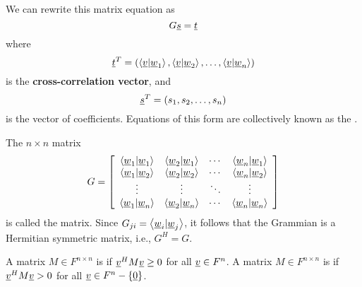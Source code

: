 We can rewrite this matrix equation as
\begin{equation*}
G \underline{s} = \underline{t}
\end{equation*}
where
\begin{equation*}
\underline{t}^T = 
\left(
\left\langle \underline{v} | \underline{w}_1 \right\rangle,
\left\langle \underline{v} | \underline{w}_2 \right\rangle, \ldots,
\left\langle \underline{v} | \underline{w}_n \right\rangle \right)
\end{equation*}
is the \textbf{cross-correlation vector}, and
\begin{equation*}
\underline{s}^T = 
\left( s_1, s_2, \ldots, s_n \right)
\end{equation*}
is the vector of coefficients.
Equations of this form are collectively known as the .

\begin{definition}
The $n \times n$ matrix
\begin{equation} \label{equation:GrammianMatrix}
G = \left[ \begin{array}{cccc}
\left\langle \underline{w}_1 | \underline{w}_1 \right\rangle
& \left\langle \underline{w}_2 | \underline{w}_1 \right\rangle & \cdots
& \left\langle \underline{w}_n | \underline{w}_1 \right\rangle \\
\left\langle \underline{w}_1 | \underline{w}_2 \right\rangle
& \left\langle \underline{w}_2 | \underline{w}_2 \right\rangle & \cdots
& \left\langle \underline{w}_n | \underline{w}_2 \right\rangle \\
\vdots & \vdots & \ddots & \vdots \\
\left\langle \underline{w}_1 | \underline{w}_n \right\rangle
& \left\langle \underline{w}_2 | \underline{w}_n \right\rangle & \cdots
& \left\langle \underline{w}_n | \underline{w}_n \right\rangle
\end{array} \right]
\end{equation}
is called the  matrix.
Since $G_{ji} = \left\langle \underline{w}_i | \underline{w}_j \right\rangle$, it follows that the Grammian is a Hermitian symmetric matrix, i.e., $G^H = G$.
\end{definition}

\begin{definition}
A matrix $M\in F^{n \times n}$ is  if $\underline{v}^H M \underline{v} \geq 0$ for all $\underline{v} \in F^n$.
A matrix $M\in F^{n \times n}$ is  if $\underline{v}^H M \underline{v} > 0$ for all $\underline{v} \in F^n - \left\{ \underline{0} \right\}$.
\end{definition}

